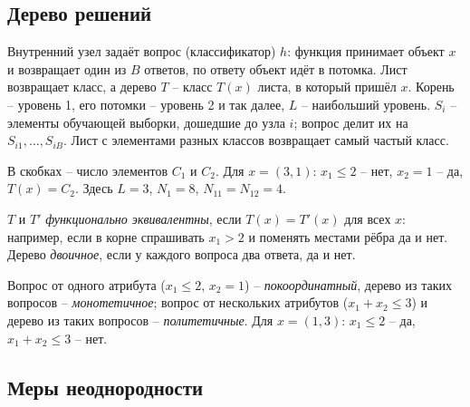 \documentclass[12pt,a4paper]{article}
\begin{document}
\subsection{Дерево решений}

Внутренний узел задаёт вопрос (классификатор) $h$: функция принимает объект $x$ и
возвращает один из $B$ ответов, по ответу объект идёт в потомка. Лист возвращает
класс, а дерево $T$ -- класс $T(x)$ листа, в который пришёл $x$. Корень -- уровень 1,
его потомки -- уровень 2 и так далее, $L$ -- наибольший уровень. $S_i$ -- элементы
обучающей выборки, дошедшие до узла $i$; вопрос делит их на $S_{i1}, \dots, S_{iB}$.
Лист с элементами разных классов возвращает самый частый класс.
\begin{center}
\end{center}
В скобках -- число элементов $C_1$ и $C_2$. Для $x = (3, 1)$: $x_1 \le 2$ -- нет,
$x_2 = 1$ -- да, $T(x) = C_2$. Здесь $L = 3$, $N_1 = 8$, $N_{11} = N_{12} = 4$.

$T$ и $T'$ \emph{функционально эквивалентны}, если $T(x) = T'(x)$ для всех $x$:
например, если в корне спрашивать $x_1 > 2$ и поменять местами рёбра да и нет. Дерево
\emph{двоичное}, если у каждого вопроса два ответа, да и нет.

Вопрос от одного атрибута ($x_1 \le 2$, $x_2 = 1$) -- \emph{покоординатный}, дерево из
таких вопросов -- \emph{монотетичное}; вопрос от нескольких атрибутов ($x_1 + x_2 \le 3$)
и дерево из таких вопросов -- \emph{политетичные}. Для $x = (1, 3)$: $x_1 \le 2$ -- да,
$x_1 + x_2 \le 3$ -- нет.

\subsection{Меры неоднородности}
\end{document}
